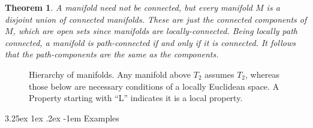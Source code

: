 \documentclass[12pt, letterpaper]{article}
\makeatletter
\newtheorem{thm}[prop]{Theorem}
\renewcommand\paragraph{\@startsection{paragraph}{4}{\z@}%
	{3.25ex \@plus1ex \@minus.2ex}%
	{-1em}%
	{\normalfont\normalsize\bfseries}}
\theoremstyle{definition}
\theoremstyle{remark}
\theoremstyle{definition}
\theoremstyle{plain}
\numberwithin{equation}{section}
\makeatother
\begin{document}
	\begin{thm}
		A manifold need not be connected, but every manifold $M$ is a disjoint union of connected manifolds.
		These are just the connected components of $M$, which are open sets since manifolds are locally-connected.
		Being locally path connected, a manifold is path-connected if and only if it is connected.
		It follows that the path-components are the same as the components.
	\end{thm}

	
	\begin{figure}
		\centering
		\caption{Hierarchy of manifolds. Any manifold above $T_2$ assumes $T_2$, whereas those below are necessary conditions
			of a locally Euclidean space.
			A Property starting with ``L'' indicates it is a local property.
		}
		\label{fig:manifold_hierarchy}
	\end{figure}

	\paragraph{Examples}
	
\end{document}
